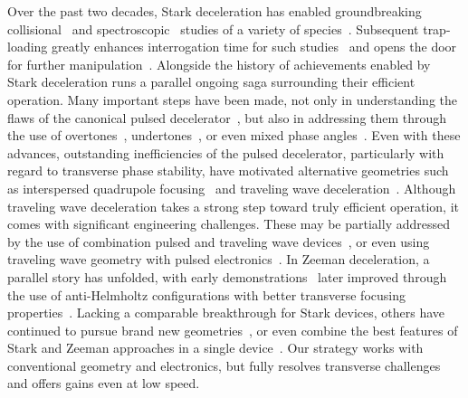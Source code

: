 \documentclass[%
 reprint,
 amsmath,amssymb,
 aps,
prl,
]{revtex4-1}
\begin{document}
\maketitle


Over the past two decades, Stark deceleration has enabled groundbreaking collisional~\cite{Sawyer2011,Kirste2012,Gao2018} and spectroscopic~\cite{Veldhoven2004,Hudson2006,Lev2006,Fast2018} studies of a variety of species~\cite{VanDeMeerakker2012}. 
Subsequent trap-loading greatly enhances interrogation time for such studies~\cite{Sawyer2008} and opens the door for further manipulation~\cite{Reens2017}. 
Alongside the history of achievements enabled by Stark deceleration runs a parallel ongoing saga surrounding their efficient operation. 
Many important steps have been made, not only in understanding the flaws of the canonical pulsed decelerator~\cite{VanDeMeerakker2006,Sawyer2008a}, but also in addressing them through the use of overtones~\cite{VanDeMeerakker2005a,Scharfenberg2009}, undertones~\cite{Zhang2016}, or even mixed phase angles~\cite{Parazzoli2009,Hou2013}. 
Even with these advances, outstanding inefficiencies of the pulsed decelerator, particularly with regard to transverse phase stability, have motivated alternative geometries such as interspersed quadrupole focusing~\cite{Sawyer2008a} and traveling wave deceleration~\cite{Osterwalder2010,VandenBerg2014,Fabrikant2014}.
Although traveling wave deceleration takes a strong step toward truly efficient operation, it comes with significant engineering challenges. 
These may be partially addressed by the use of combination pulsed and traveling wave devices~\cite{Quintero-Perez2013}, or even using traveling wave geometry with pulsed electronics~\cite{Hou2016,Shyur2017}. 
In Zeeman deceleration, a parallel story has unfolded, with early demonstrations~\cite{Vanhaecke2007,Narevicius2008} later improved through the use of anti-Helmholtz configurations with better transverse focusing properties~\cite{LavertOfir2011,Dulitz2014}.
Lacking a comparable breakthrough for Stark devices, others have continued to pursue brand new geometries~\cite{Wang2016}, or even combine the best features of Stark and Zeeman approaches in a single device~\cite{Cremers2017,Plomp2019}.
Our strategy works with conventional geometry and electronics, but fully resolves transverse challenges and offers gains even at low speed.
\end{document}
